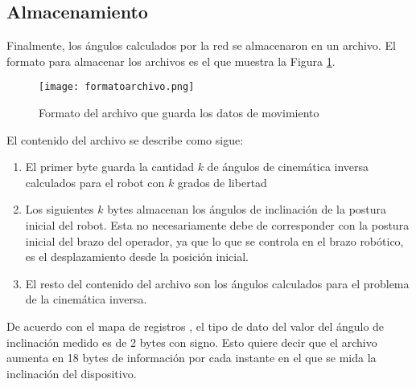 \newpage
\subsection{Almacenamiento}

Finalmente, los ángulos calculados por la red se almacenaron en un archivo. El formato para almacenar los archivos es el que muestra la Figura \ref{fig:formatoarchivo}.

\begin{figure}[htb]
	\centering
	\texttt{[image: formatoarchivo.png]}
	\caption{Formato del archivo que guarda los datos de movimiento}
	\label{fig:formatoarchivo}
\end{figure}

El contenido del archivo se describe como sigue:

\begin{enumerate}
	\item El primer byte guarda la cantidad $k$ de ángulos de cinemática inversa calculados para el robot con $k$ grados de libertad
	\item Los siguientes $k$ bytes almacenan los ángulos de inclinación de la postura inicial del robot. Esta no necesariamente debe de corresponder con la postura inicial del brazo del operador, ya que lo que se controla en el brazo robótico, es el desplazamiento desde la posición inicial.
	\item El resto del contenido del archivo son los ángulos calculados para el problema de la cinemática inversa.
\end{enumerate}

De acuerdo con el mapa de registros \cite{registermap}, el tipo de dato del valor del ángulo de inclinación medido es de 2 bytes con signo. Esto quiere decir que el archivo aumenta en 18 bytes de información por cada instante en el que se mida la inclinación del dispositivo.